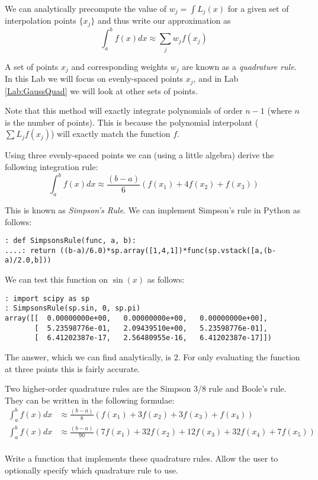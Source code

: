We can analytically precompute the value of $w_j = \int L_j(x)$ for a given set of interpolation points $\{x_j\}$ and thus write our approximation as
\[
\int_a^b f(x) dx \approx \sum_j w_j f(x_j)
\]

A set of points $x_j$ and corresponding weights $w_j$ are known as a \emph{quadrature rule}. In this Lab we will focus on evenly-spaced points $x_j$, and in Lab \ref{Lab:GaussQuad} we will look at other sets of points.

Note that this method will exactly integrate polynomials of order $n-1$ (where $n$ is the number of points). This is because the polynomial interpolant ($\sum L_j f(x_j)$) will exactly match the function $f$.

Using three evenly-spaced points we can (using a little algebra) derive the following integration rule:
\[
\int_a^b f(x) dx \approx \frac{(b-a)}{6}\left(f(x_1) + 4 f(x_2) + f(x_3)\right)
\]

This is known as \emph{Simpson's Rule}. We can implement Simpson's rule in Python as follows:
\begin{lstlisting}[style=python]
: def SimpsonsRule(func, a, b):
....: return ((b-a)/6.0)*sp.array([1,4,1])*func(sp.vstack([a,(b-a)/2.0,b]))
\end{lstlisting}


We can test this function on $\sin(x)$ as follows:
\begin{lstlisting}[style=python]
: import scipy as sp
: SimpsonsRule(sp.sin, 0, sp.pi)
array([[  0.00000000e+00,   0.00000000e+00,   0.00000000e+00],
       [  5.23598776e-01,   2.09439510e+00,   5.23598776e-01],
       [  6.41202387e-17,   2.56480955e-16,   6.41202387e-17]])
\end{lstlisting}


The answer, which we can find analytically, is $2$. For only evaluating the function at three points this is fairly accurate.

\begin{problem}
Two higher-order quadrature rules are the Simpson 3/8 rule and Boole's rule. They can be written in the following formulae:
\begin{align*}
\int_a^b f(x) dx &\approx \frac{(b-a)}{8}\left(f(x_1) + 3 f(x_2) + 3 f(x_3) + f(x_4)\right) \\
\int_a^b f(x) dx &\approx \frac{(b-a)}{90}\left(7f(x_1) + 32 f(x_2) + 12 f(x_3) + 32f(x_4) + 7 f(x_5)\right) \\
\end{align*}

Write a function that implements these quadrature rules. Allow the user to optionally specify which quadrature rule to use.
\end{problem}


